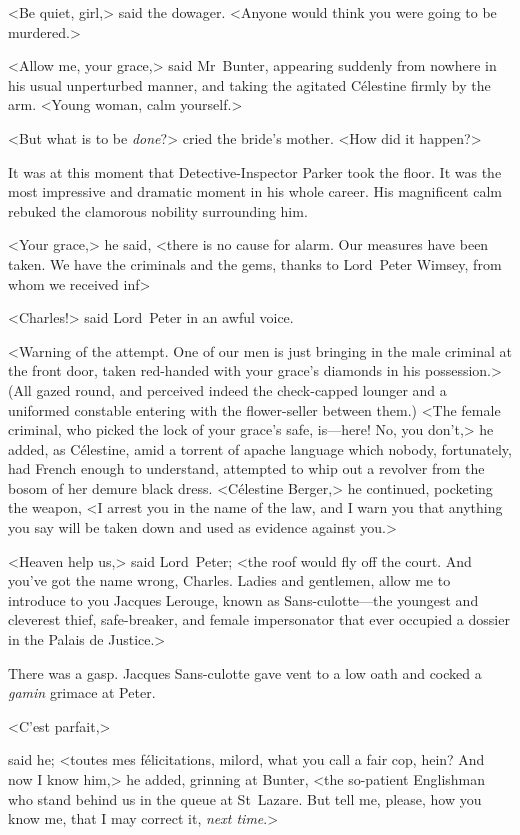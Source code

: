 <Be quiet, girl,> said the dowager. <Anyone would think you were going to be murdered.>

<Allow me, your grace,> said Mr~Bunter, appearing suddenly from nowhere in his usual unperturbed manner, and taking the agitated Célestine firmly by the arm. <Young woman, calm yourself.>

<But what is to be \emph{done}?> cried the bride's mother. <How did it happen?>

It was at this moment that Detective-Inspector Parker took the floor. It was the most impressive and dramatic moment in his whole career. His magnificent calm rebuked the clamorous nobility surrounding him.

<Your grace,> he said, <there is no cause for alarm. Our measures have been taken. We have the criminals and the gems, thanks to Lord~Peter Wimsey, from whom we received inf\longdash>

<Charles!> said Lord~Peter in an awful voice.

<Warning of the attempt. One of our men is just bringing in the male criminal at the front door, taken red-handed with your grace's diamonds in his possession.> (All gazed round, and perceived indeed the check-capped lounger and a uniformed constable entering with the flower-seller between them.) <The female criminal, who picked the lock of your grace's safe, is—here! No, you don't,> he added, as Célestine, amid a torrent of apache language which nobody, fortunately, had French enough to understand, attempted to whip out a revolver from the bosom of her demure black dress. <Célestine Berger,> he continued, pocketing the weapon, <I arrest you in the name of the law, and I warn you that anything you say will be taken down and used as evidence against you.>

<Heaven help us,> said Lord~Peter; <the roof would fly off the court. And you've got the name wrong, Charles. Ladies and gentlemen, allow me to introduce to you Jacques Lerouge, known as Sans-culotte—the youngest and cleverest thief, safe-breaker, and female impersonator that ever occupied a dossier in the Palais de Justice.>

There was a gasp. Jacques Sans-culotte gave vent to a low oath and cocked a \textit{gamin} grimace at Peter.

\begin{french}<C'est parfait,>\end{french} said he; <toutes mes félicitations, milord, what you call a fair cop, hein? And now I know him,> he added, grinning at Bunter, <the so-patient Englishman who stand behind us in the queue at St~Lazare. But tell me, please, how you know me, that I may correct it, \emph{next time}.>

